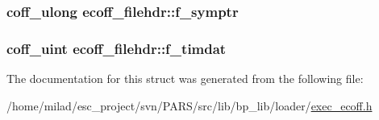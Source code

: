 \label{structecoff__filehdr_a3caac3fb501a963bfba324a21709ab65}
\hypertarget{structecoff__filehdr_a2cd3ccadbb8604f38b24b038cf8559c6}{
\subsubsection[{f\_\-symptr}]{\setlength{\rightskip}{0pt plus 5cm}coff\_\-ulong {\bf ecoff\_\-filehdr::f\_\-symptr}}}
\label{structecoff__filehdr_a2cd3ccadbb8604f38b24b038cf8559c6}
\hypertarget{structecoff__filehdr_aa5fd02a3c9926125af96c38f41090a7e}{
\subsubsection[{f\_\-timdat}]{\setlength{\rightskip}{0pt plus 5cm}coff\_\-uint {\bf ecoff\_\-filehdr::f\_\-timdat}}}
\label{structecoff__filehdr_aa5fd02a3c9926125af96c38f41090a7e}


The documentation for this struct was generated from the following file:\begin{DoxyCompactItemize}
\item 
/home/milad/esc\_\-project/svn/PARS/src/lib/bp\_\-lib/loader/\hyperlink{exec__ecoff_8h}{exec\_\-ecoff.h}\end{DoxyCompactItemize}
